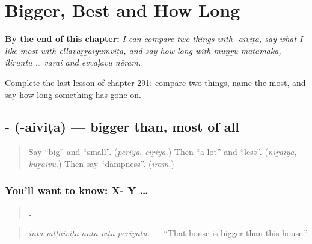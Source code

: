 
\chapter{Bigger, Best and How Long}
\label{ch:ta-bigger-best-and-how-long}

\begin{chapteropening}
\textbf{By the end of this chapter:} \emph{I can compare two things with -aiviṭa, say what I like most with ellāvaṟṟaiyumviṭa, and say how long with mūṉṟu mātamāka, -iliruntu … varai and evvaḷavu nēram.}

Complete the last lesson of chapter 291: compare two things, name the most, and say how long something has gone on.
\end{chapteropening}

\section[\texorpdfstring{-\ta{ஐவிட} (-aiviṭa)}{-ஐவிட (-aiviṭa)}]{- (-aiviṭa) — bigger than, most of all}

\label{lesson:TA-C291-aivita}



\begin{quote}
Say \textquotedblleft{}big\textquotedblright{} and \textquotedblleft{}small\textquotedblright{}. (\emph{periya}, \emph{ciṟiya}.) Then \textquotedblleft{}a lot\textquotedblright{} and \textquotedblleft{}less\textquotedblright{}. (\emph{niṟaiya}, \emph{kuṟaivu}.) Then say \textquotedblleft{}dampness\textquotedblright{}. (\emph{īram}.)
\end{quote}

\subsection*{You'll want to know: X- Y …}
\begin{quote}
\textbf{    .}
\end{quote}

\begin{quote}
\emph{inta vīṭṭaiviṭa anta vīṭu periyatu.} — \textquotedblleft{}That house is bigger than this house.\textquotedblright{}
\end{quote}

